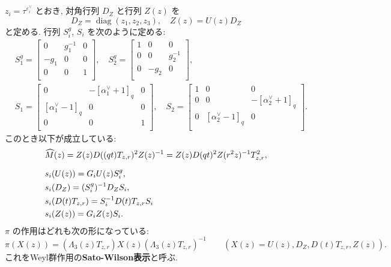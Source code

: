 \documentclass[12pt,twoside,dvipdfm]{msjproc}
\theoremstyle{definition} %
\theoremstyle{definition} %
\theoremstyle{definition} %
\numberwithin{theorem}{section}
\numberwithin{equation}{section}
\numberwithin{figure}{section}
\numberwithin{table}{section}
\newcommand\diag{\mathop{\mathrm{diag}}\nolimits}
\newcommand\hM{{\widehat{M}}}
\newcommand\ev{\varepsilon^\vee}
\newcommand\av{\alpha^\vee}
\begin{document}
$z_i=\tau^{\ev_i}$ とおき, 対角行列 $D_Z$ と行列 $Z(z)$ を
\begin{equation*}
  D_Z=\diag(z_1,z_2,z_3), \quad Z(z) = U(z)D_Z
\end{equation*} 
と定める. 行列 $S^g_i$, $S_i$ を次のように定める:
\begin{align*}
 &
 S^g_1 =
 \begin{bmatrix}
   0    & g_1^{-1} & 0 \\
   -g_1 & 0        & 0 \\
   0    & 0        & 1 \\
 \end{bmatrix},
 \quad
 S^g_2 =
 \begin{bmatrix}
   1 & 0 & 0 \\
   0 & 0 & g_2^{-1} \\
   0 & -g_2 & 0 \\
 \end{bmatrix},
 \\ &
 S_1 =
 \begin{bmatrix}
   0           & -[\av_1+1]_q & 0 \\
   [\av_1-1]_q & 0        & 0 \\
   0           & 0        & 1 \\
 \end{bmatrix},
 \quad
 S_2 =
 \begin{bmatrix}
   1 & 0           & 0 \\
   0 & 0           & -[\av_2+1]_q \\
   0 & [\av_2-1]_q & 0 \\
 \end{bmatrix}.
\end{align*}
このとき以下が成立している:
\begin{align*}
 &
 \hM(z)
 = Z(z)D((qt)T_{z,r})^2 Z(z)^{-1}
 = Z(z)D(qt)^2Z(r^2z)^{-1}T_{z,r}^2,
 \\[\medskipamount] &
 s_i(U(z)) = G_i U(z) S^g_i, 
 \\ &
 s_i(D_Z) = (S^g_i)^{-1} D_Z S_i, \
 \\ &
 s_i(D(t)T_{z,r}) = S_i^{-1} D(t)T_{z,r} S_i
 \\ &
 s_i(Z(z)) = G_i Z(z) S_i.
\end{align*}
$\pi$ の作用はどれも次の形になっている:
\begin{equation*}
  \pi(X(z)) = (\Lambda_3(z)T_{z,r})X(z)(\Lambda_3(z)T_{z,r})^{-1} \qquad
  (X(z)=U(z),D_Z,D(t)T_{z,r},Z(z)).
\end{equation*}
これをWeyl群作用の{\bf Sato-Wilson表示}と呼ぶ.
\end{document}
